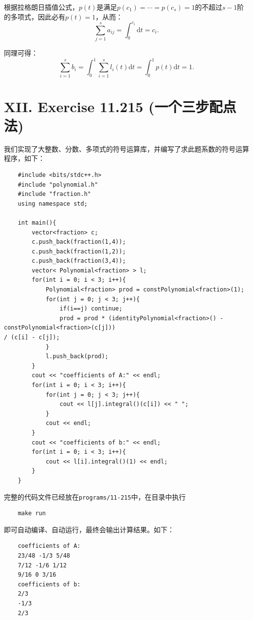 \documentclass[twoside,a4paper]{article}
\begin{document}
根据拉格朗日插值公式，$p(t)$是满足$p(c_1)=\cdots=p(c_s)=1$的不超过$s-1$阶的多项式，因此必有$p(t)=1$，从而：
\begin{equation*}
    \sum_{j=1}^s a_{ij}=\int_{0}^{c_i}\text{d}t=c_i.
\end{equation*}

同理可得：
\begin{equation*}
    \sum_{i=1}^s b_{i}=\int_{0}^{1}\sum_{i=1}^sl_i(t)\text{d}t=\int_{0}^{1}p(t)\text{d}t=1.
\end{equation*}

\section*{XII. Exercise 11.215 (一个三步配点法)}

\;\;\;\;\;\;我们实现了大整数、分数、多项式的符号运算库，并编写了求此题系数的符号运算程序，如下：
\begin{lstlisting}
    #include <bits/stdc++.h>
    #include "polynomial.h"
    #include "fraction.h"
    using namespace std;
    
    int main(){
        vector<fraction> c;
        c.push_back(fraction(1,4));
        c.push_back(fraction(1,2));
        c.push_back(fraction(3,4));
        vector< Polynomial<fraction> > l;
        for(int i = 0; i < 3; i++){
            Polynomial<fraction> prod = constPolynomial<fraction>(1);
            for(int j = 0; j < 3; j++){
                if(i==j) continue;
                prod = prod * (identityPolynomial<fraction>() - constPolynomial<fraction>(c[j])) 
/ (c[i] - c[j]);
            }
            l.push_back(prod);
        }
        cout << "coefficients of A:" << endl;
        for(int i = 0; i < 3; i++){
            for(int j = 0; j < 3; j++){
                cout << l[j].integral()(c[i]) << " ";
            }
            cout << endl;
        }
        cout << "coefficients of b:" << endl;
        for(int i = 0; i < 3; i++){
            cout << l[i].integral()(1) << endl;
        }
    }
\end{lstlisting}

完整的代码文件已经放在\verb|programs/11-215|中，在目录中执行
\begin{lstlisting}
    make run
\end{lstlisting}

即可自动编译、自动运行，最终会输出计算结果。如下：
\begin{lstlisting}
    coefficients of A:
    23/48 -1/3 5/48 
    7/12 -1/6 1/12 
    9/16 0 3/16 
    coefficients of b:
    2/3
    -1/3
    2/3
\end{lstlisting}
\end{document}
